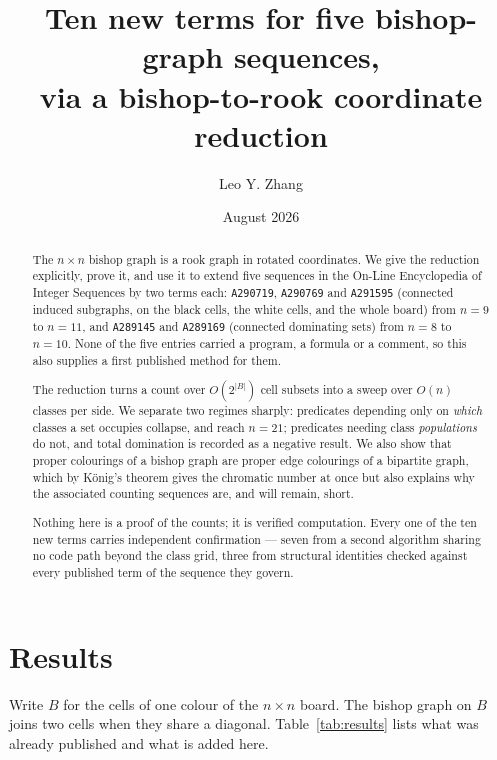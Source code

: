 \documentclass[11pt]{article}
\title{Ten new terms for five bishop-graph sequences,\\
       via a bishop-to-rook coordinate reduction}
\author{Leo Y. Zhang}
\date{August 2026}
\theoremstyle{remark}
\newcommand{\seq}[1]{\texttt{#1}}
\begin{document}
\maketitle

\begin{abstract}
The $n \times n$ bishop graph is a rook graph in rotated coordinates. We give the
reduction explicitly, prove it, and use it to extend five sequences in the
On-Line Encyclopedia of Integer Sequences by two terms each: \seq{A290719},
\seq{A290769} and \seq{A291595} (connected induced subgraphs, on the black
cells, the white cells, and the whole board) from $n=9$ to $n=11$, and
\seq{A289145} and \seq{A289169} (connected dominating sets) from $n=8$ to
$n=10$. None of the five entries carried a program, a formula or a comment, so
this also supplies a first published method for them.

The reduction turns a count over $O(2^{|B|})$ cell subsets into a sweep over
$O(n)$ classes per side. We separate two regimes sharply: predicates depending
only on \emph{which} classes a set occupies collapse, and reach $n=21$;
predicates needing class \emph{populations} do not, and total domination is
recorded as a negative result. We also show that proper colourings of a bishop
graph are proper edge colourings of a bipartite graph, which by K\"onig's theorem
gives the chromatic number at once but also explains why the associated counting
sequences are, and will remain, short.

Nothing here is a proof of the counts; it is verified computation. Every one of
the ten new terms carries independent confirmation --- seven from a second
algorithm sharing no code path beyond the class grid, three from structural
identities checked against every published term of the sequence they govern.
\end{abstract}

\section{Results}

Write $B$ for the cells of one colour of the $n \times n$ board. The bishop graph
on $B$ joins two cells when they share a diagonal. Table~\ref{tab:results} lists
what was already published and what is added here.
\end{document}
